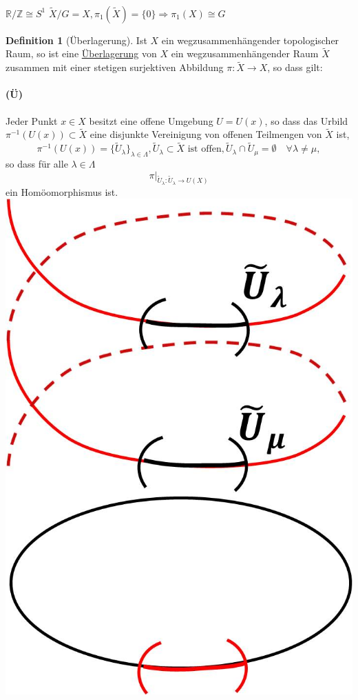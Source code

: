 \documentclass[a4paper,11pt,notitlepage]{report}
\theoremstyle{remark}
\theoremstyle{definition}
\newtheorem{definition}{Definition}[chapter]
\newcommand{\R}{{\ensuremath{\mathbb{R}}}}
\newcommand{\Z}{{\ensuremath{\mathbb{Z}}}}
\begin{document}
\paragraph{}
$\R / \Z \cong S^1$ \newline
$\tilde{X} /G = X, \pi_1(\tilde{X}) = \{0\} \Rightarrow \pi_1(X) \cong G$

\newpage 

\begin{definition}[Überlagerung]
	Ist $X$ ein wegzusammenhängender topologischer Raum, so ist eine \underline{Überlagerung} von $X$ ein wegzusammenhängender Raum $\tilde{X}$ zusammen mit einer stetigen surjektiven Abbildung $\pi \colon \tilde{X} \rightarrow X$, so dass gilt:
	\paragraph{(Ü)} \label{Ü} Jeder Punkt $x \in X$ besitzt eine offene Umgebung $U=U(x)$, so dass das Urbild $\pi^{-1}(U(x)) \subset \tilde{X}$ eine disjunkte Vereinigung von offenen Teilmengen von $\tilde{X}$ ist, 
	$$\pi^{-1}(U(x)) = \{\tilde{U}_\lambda\}_{\lambda \in \Lambda}, \tilde{U}_\lambda \subset \tilde{X}\text{ ist offen}, \tilde{U}_\lambda \cap \tilde{U}_\mu = \emptyset \quad \forall \lambda \neq \mu,$$ 
	so dass für alle $\lambda \in \Lambda$ 
	$$\pi \big |_{\tilde{U}_\lambda \colon \tilde{U}_\lambda \rightarrow U(X)}$$ ein Homöomorphismus ist.\newline
	\includegraphics[scale=0.4]{images/Spirale_disjunkt.jpg}

\end{definition}
\end{document}
